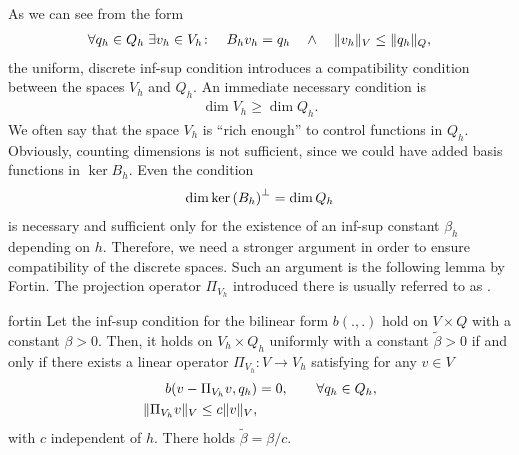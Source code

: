 \begin{intro}
  As we can see from the form
  \begin{gather*}
    \forall q_h\in Q_h \;
    \exists v_h\in V_h\colon
    \quad B_h v_h = q_h
    \quad\wedge\quad
    \lVert v_h\rVert_V \le \lVert q_h\rVert_Q,
  \end{gather*}
  the uniform, discrete inf-sup condition introduces a compatibility
  condition between the spaces $V_h$ and $Q_h$. An immediate necessary
  condition is
  \begin{gather}
    \dim V_h \ge \dim Q_h.
  \end{gather}
  We often say that the space $V_h$ is ``rich enough'' to control
  functions in $Q_h$. Obviously, counting dimensions is not
  sufficient, since we could have added basis functions in
  $\ker{B_h}$. Even the condition
  \begin{gather*}
    \dim\operatorname{ker}\left(B_h\right)^\perp = \dim Q_h
  \end{gather*}
  is necessary and sufficient only for the existence of an inf-sup
  constant $\beta_h$ depending on $h$. Therefore, we need a stronger
  argument in order to ensure compatibility of the discrete
  spaces. Such an argument is the following lemma by Fortin. The
  projection operator $\Pi_{V_h}$ introduced there is usually referred
  to as .
\end{intro}

\begin{Lemma}{fortin}
  Let the inf-sup condition for the bilinear form $b(.,.)$
  hold on $V\times Q$ with a constant
  $\beta>0$. Then, it holds on $V_h\times Q_h$ uniformly with a
  constant $\tilde\beta>0$ if and only if there exists a linear
  operator $\Pi_{V_h}\colon V\to V_h$ satisfying for any $v\in V$
  \begin{align}
    \label{eq:galerkin:15}
    b(v-\Pi_{V_h}v,q_h) &= 0,\qquad\forall q_h\in Q_h, \\
    \lVert\Pi_{V_h}v\rVert_V \le c \lVert v\rVert_V,
  \end{align}
  with $c$ independent of $h$. There holds $\tilde\beta = \beta/c$.
\end{Lemma}

